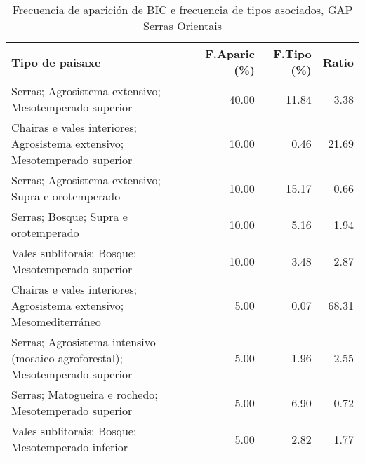 \begin{table}[p]
\centering
\caption{Frecuencia de aparición de BIC e frecuencia de tipos asociados, GAP Serras Orientais} 
\label{vbic5}
\begin{tabular}{lrrr}
  \hline
Tipo de paisaxe & F.Aparic (\%) & F.Tipo (\%) & Ratio \\ 
  \hline
Serras; Agrosistema extensivo; Mesotemperado superior & 40.00 & 11.84 & 3.38 \\ 
  Chairas e vales interiores; Agrosistema extensivo; Mesotemperado superior & 10.00 & 0.46 & 21.69 \\ 
  Serras; Agrosistema extensivo; Supra e orotemperado & 10.00 & 15.17 & 0.66 \\ 
  Serras; Bosque; Supra e orotemperado & 10.00 & 5.16 & 1.94 \\ 
  Vales sublitorais; Bosque; Mesotemperado superior & 10.00 & 3.48 & 2.87 \\ 
  Chairas e vales interiores; Agrosistema extensivo; Mesomediterráneo & 5.00 & 0.07 & 68.31 \\ 
  Serras; Agrosistema intensivo (mosaico agroforestal); Mesotemperado superior & 5.00 & 1.96 & 2.55 \\ 
  Serras; Matogueira e rochedo; Mesotemperado superior & 5.00 & 6.90 & 0.72 \\ 
  Vales sublitorais; Bosque; Mesotemperado inferior & 5.00 & 2.82 & 1.77 \\ 
   \hline
\end{tabular}
\end{table}
